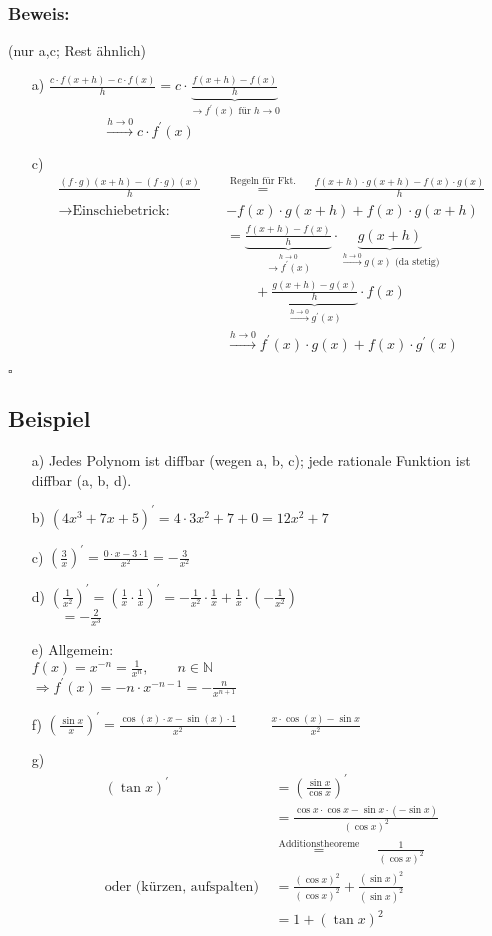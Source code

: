 \documentclass[12pt, titlepage]{article}
\newcommand{\N}{\mathds{N}}
\renewcommand{\>}{\rightarrow}
\renewcommand{\*}{\cdot}
\begin{document}
	\subsubsection*{Beweis:}
	(nur a,c; Rest ähnlich)
	\begin{itemize}
		\item[a)] $\frac{c\*f(x+h)-c\*f(x)}{h}=c\*\underbrace{\frac{f(x+h)-f(x)}{h}}_{\>f^\prime(x)\textrm{ für }h\>0}$\\
		${}^{}\qquad\qquad{}^{}\quad\overset{h\>0}{\>}c\*f^\prime(x)$
		\item[c)] \begin{align*}
			\frac{(f\*g)(x+h)-(f\*g)(x)}{h}\quad&\overset{\textrm{Regeln für Fkt.}}{=}\quad\frac{f(x+h)\*g(x+h)-f(x)\*g(x)}{h}\\
			\>\textrm{Einschiebetrick: }&-f(x)\*g(x+h)+f(x)\*g(x+h)\\
			&=\underbrace{\frac{f(x+h)-f(x)}{h}}_{\overset{h\>0}{\>f^\prime(x)}}\*\underbrace{g(x+h)}_{\overset{h\>0}{\>}g(x)\textrm{ (da stetig)}}\\
			&\qquad+\underbrace{\frac{g(x+h)-g(x)}{h}}_{\overset{h\>0}{\>}g^\prime(x)}\*f(x)\\
			&\overset{h\>0}{\>}f^\prime(x)\*g(x)+f(x)\*g^\prime(x)
		\end{align*}
	\end{itemize}
	\hfill$\square$
	\subsection{Beispiel}
	\begin{itemize}
		\item[a)] Jedes Polynom ist diffbar (wegen a, b, c); jede rationale Funktion ist diffbar (a, b, d).
		\item[b)] $(4x^3+7x+5)^\prime=4\*3x^2+7+0=12x^2+7$
		\item[c)] $(\frac{3}{x})^\prime=\frac{0\*x-3\*1}{x^2}=-\frac{3}{x^2}$
		\item[d)] $(\frac{1}{x^2})^\prime=(\frac{1}{x}\*\frac{1}{x})^\prime=-\frac{1}{x^2}\*\frac{1}{x}+\frac{1}{x}\*(-\frac{1}{x^2})$\\
		${}^{}\qquad=-\frac{2}{x^3}$
		\item[e)] Allgemein:\\
		$f(x)=x^{-n}=\frac{1}{x^n},\qquad n\in\N$\\
		$\Rightarrow f^\prime(x)=-n\*x^{-n-1}=-\frac{n}{x^{n+1}}$
		\item[f)]$(\frac{\sin x}{x})^\prime=\frac{\cos(x)\*x-\sin(x)\*1}{x^2}$
		${}^{}\qquad\frac{x\*\cos(x)-\sin x}{x^2}$
		\item[g)] \begin{align*}
			(\tan x)^\prime&=(\frac{\sin x}{\cos x})^\prime\\
			&=\frac{\cos x\*\cos x-\sin x\*(-\sin x)}{(\cos x)^2}\\
			&\overset{\textrm{Additionstheoreme}}{=}\quad\frac{1}{(\cos x)^2}\\
			\textrm{oder (kürzen, aufspalten) }&=\frac{(\cos x)^2}{(\cos x)^2}+\frac{(\sin x)^2}{(\sin x)^2}\\
			&=1+(\tan x)^2
		\end{align*}
	\end{itemize}
\end{document}
